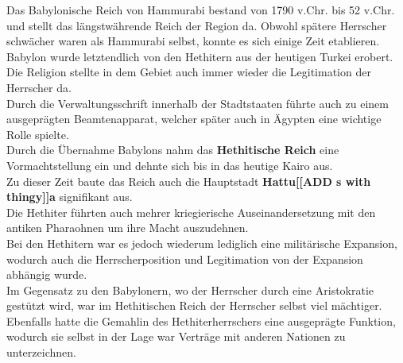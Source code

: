 \documentclass{article}
\begin{document}
	Das Babylonische Reich von Hammurabi bestand von 1790 v.Chr. bis 52 v.Chr. und stellt das längstwährende Reich der Region da. Obwohl spätere Herrscher schwächer waren als Hammurabi selbst, konnte es sich einige Zeit etablieren. \\
	Babylon wurde letztendlich von den Hethitern aus der heutigen Turkei erobert. \\
	Die Religion stellte in dem Gebiet auch immer wieder die Legitimation der Herrscher da. \\
	Durch die Verwaltungsschrift innerhalb der Stadtstaaten führte auch zu einem ausgeprägten Beamtenapparat, welcher später auch in Ägypten eine wichtige Rolle spielte. \\
	Durch die Übernahme Babylons nahm das \textbf{Hethitische Reich} eine Vormachtstellung ein und dehnte sich bis in das heutige Kairo aus. \\
	Zu dieser Zeit baute das Reich auch die Hauptstadt \textbf{Hattu[[ADD s with thingy]]a} signifikant aus. \\
	Die Hethiter führten auch mehrer kriegierische Auseinandersetzung mit den antiken Pharaohnen um ihre Macht auszudehnen. \\
	Bei den Hethitern war es jedoch wiederum lediglich eine militärische Expansion, wodurch auch die Herrscherposition und Legitimation von der Expansion abhängig wurde. \\
	Im Gegensatz zu den Babylonern, wo der Herrscher durch eine Aristokratie gestützt wird, war im Hethitischen Reich der Herrscher selbst viel mächtiger. \\
	Ebenfalls hatte die Gemahlin des Hethiterherrschers eine ausgeprägte Funktion, wodurch sie selbst in der Lage war Verträge mit anderen Nationen zu unterzeichnen. \\
\end{document}
